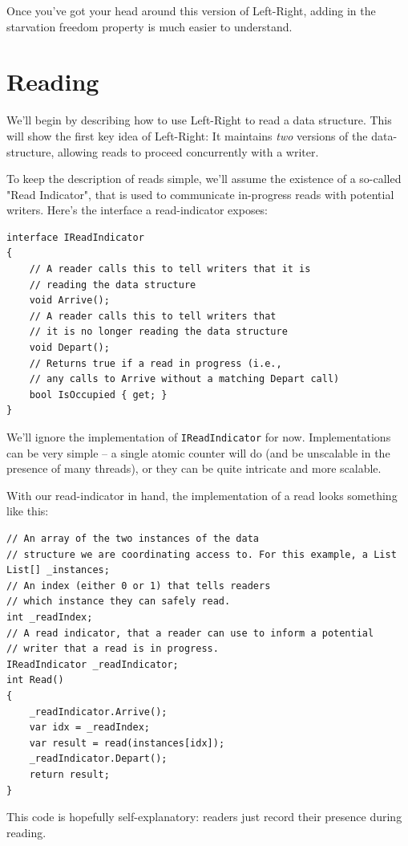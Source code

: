 \documentclass[11pt]{article}
\begin{document}
Once you've got your head around this version of Left-Right, adding in the starvation freedom property is much easier to understand.

\section{Reading}

We'll begin by describing how to use Left-Right to read a data structure. This will show the first key idea of Left-Right: It maintains \emph{two} versions of the data-structure, allowing reads to proceed concurrently with a writer.

To keep the description of reads simple, we'll assume the existence of a so-called "Read Indicator", that is used to communicate in-progress reads with potential writers. Here's the interface a read-indicator exposes:

\begin{lstlisting}
interface IReadIndicator
{
    // A reader calls this to tell writers that it is 
    // reading the data structure
    void Arrive();
    // A reader calls this to tell writers that 
    // it is no longer reading the data structure
    void Depart();
    // Returns true if a read in progress (i.e., 
    // any calls to Arrive without a matching Depart call)
    bool IsOccupied { get; }
}
\end{lstlisting}

We'll ignore the implementation of \texttt{IReadIndicator} for now. Implementations can be very simple -- a single atomic counter will do (and be unscalable in the presence of many threads), or they can be quite intricate and more scalable.

With our read-indicator in hand, the implementation of a read looks something like this:

\begin{lstlisting}
// An array of the two instances of the data
// structure we are coordinating access to. For this example, a List
List[] _instances;
// An index (either 0 or 1) that tells readers
// which instance they can safely read.
int _readIndex;
// A read indicator, that a reader can use to inform a potential
// writer that a read is in progress.
IReadIndicator _readIndicator;
int Read()
{
    _readIndicator.Arrive();
    var idx = _readIndex;
    var result = read(instances[idx]);
    _readIndicator.Depart();
    return result;
}
\end{lstlisting}

This code is hopefully self-explanatory: readers just record their presence during reading. 
\end{document}
